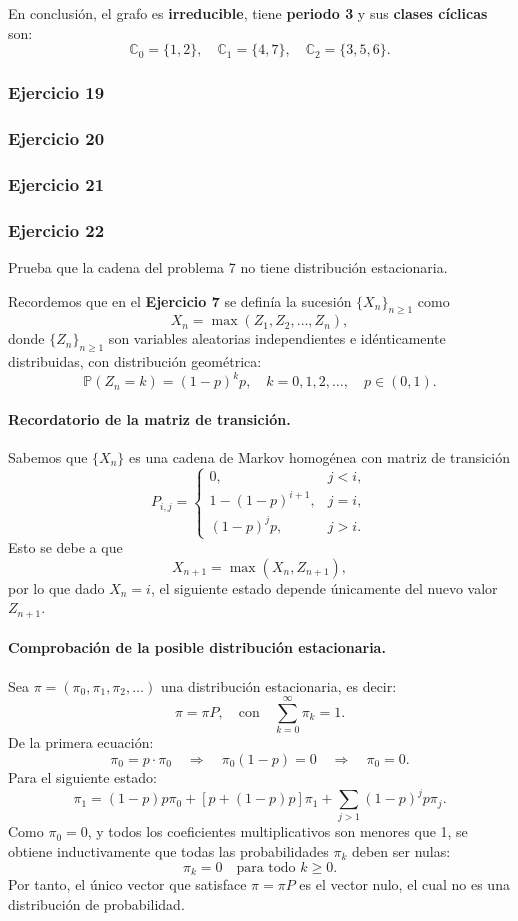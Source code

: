 En conclusión, el grafo es \textbf{irreducible}, tiene \textbf{periodo 3} y sus \textbf{clases cíclicas} son:
\[
\boxed{\mathbb{C}_0 = \{1,2\}, \quad \mathbb{C}_1 = \{4,7\}, \quad \mathbb{C}_2 = \{3,5,6\}.}
\]

\subsubsection{Ejercicio 19}
\subsubsection{Ejercicio 20}
\subsubsection{Ejercicio 21}
\subsubsection{Ejercicio 22}
\begin{exercise}
Prueba que la cadena del problema 7 no tiene distribución estacionaria.
\end{exercise}

Recordemos que en el \textbf{Ejercicio 7} se definía la sucesión $\{X_n\}_{n\ge1}$ como
\[
X_n = \max(Z_1, Z_2, \dots, Z_n),
\]
donde $\{Z_n\}_{n\ge1}$ son variables aleatorias independientes e idénticamente distribuidas, con distribución geométrica:
\[
\mathbb{P}(Z_n = k) = (1-p)^k p, \quad k = 0,1,2,\dots, \quad p \in (0,1).
\]

\paragraph{Recordatorio de la matriz de transición.}
Sabemos que $\{X_n\}$ es una cadena de Markov homogénea con matriz de transición
\[
P_{i,j} = 
\begin{cases}
0, & j < i,\\[4pt]
1-(1-p)^{i+1}, & j = i,\\[4pt]
(1-p)^j p, & j > i.
\end{cases}
\]
Esto se debe a que
\[
X_{n+1} = \max(X_n, Z_{n+1}),
\]
por lo que dado $X_n = i$, el siguiente estado depende únicamente del nuevo valor $Z_{n+1}$.

\paragraph{Comprobación de la posible distribución estacionaria.}
Sea $\pi = (\pi_0, \pi_1, \pi_2, \dots)$ una distribución estacionaria, es decir:
\[
\pi = \pi P, \quad \text{con} \quad \sum_{k=0}^\infty \pi_k = 1.
\]
De la primera ecuación:
\[
\pi_0 = p \cdot \pi_0 \quad \Longrightarrow \quad \pi_0(1-p) = 0 \quad \Longrightarrow \quad \pi_0 = 0.
\]
Para el siguiente estado:
\[
\pi_1 = (1-p)p \pi_0 + \left[p + (1-p)p\right] \pi_1 + \sum_{j>1}(1-p)^j p \pi_j.
\]
Como $\pi_0 = 0$, y todos los coeficientes multiplicativos son menores que 1, se obtiene inductivamente que todas las probabilidades $\pi_k$ deben ser nulas:
\[
\pi_k = 0 \quad \text{para todo } k \ge 0.
\]
Por tanto, el único vector que satisface $\pi = \pi P$ es el vector nulo, el cual no es una distribución de probabilidad.

